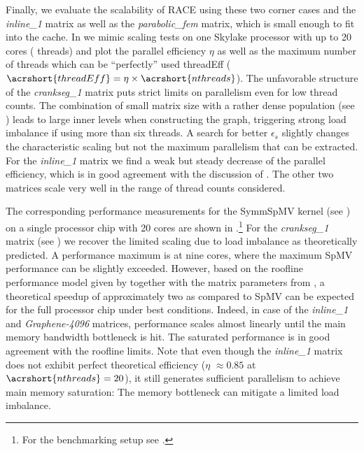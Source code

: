 Finally, we evaluate the scalability of RACE using these two corner cases and
the \emph{inline\_1} matrix as well as the \emph{parabolic\_fem} matrix, which
is small enough to fit into the cache.  In  we
mimic scaling tests on one Skylake processor with up to 20 cores (\ie
threads) and plot the parallel efficiency $\eta$ as well as the maximum number
of threads which can be ``perfectly'' used \acrshort{threadEff} (\ie
$\acrshort{threadEff} = \eta\times\acrshort{nthreads}$).  The unfavorable structure
of the \emph{crankseg\_1} matrix puts strict limits on parallelism even for low
thread counts.  The combination of small matrix size with a rather dense
population (see ) leads to large inner levels when
constructing the graph, triggering strong load imbalance if using more than six
threads. A search for better $\epsilon_s$ slightly changes the characteristic
scaling but not the maximum parallelism that can be extracted. For
the \emph{inline\_1} matrix we find a weak but steady decrease of the parallel
efficiency, which is in good agreement with the discussion
of . The other two matrices scale very well in the
range of thread counts considered.


The corresponding performance measurements for the \acrshort{SymmSpMV} kernel
(see ) on a single \SKX processor chip with 20 cores are
shown in .\footnote{For the benchmarking setup
see .}
For the \emph{crankseg\_1} matrix (see ) we recover
the limited scaling due to load imbalance as theoretically predicted. A
performance maximum is at nine cores, where the maximum \acrshort{SpMV}
performance can be slightly exceeded. However, based on the roof{}line performance
model given by  together with
the matrix parameters from , a theoretical speedup of
approximately two as compared to \acrshort{SpMV} can be expected for the full
processor chip under best conditions.
Indeed, in case of the \emph{inline\_1} and \emph{Graphene-4096}
matrices, performance
scales almost linearly until the main memory bandwidth bottleneck is hit. The
saturated performance is in good agreement with the roof{}line limits.
Note  that even though the \emph{inline\_1} matrix does not exhibit
perfect theoretical efficiency ($\eta$ $\approx 0.85$ at
$\acrshort{nthreads}=20$), it still generates sufficient parallelism to achieve
main memory saturation: The memory bottleneck can mitigate
a limited load imbalance.


